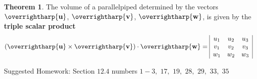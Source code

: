 \documentclass[letterpaper, twoside, 12pt]{book}
\newcommand{\<}{\langle}
\renewcommand{\>}{\rangle}
\theoremstyle{definition}
\newtheorem{theorem}{Theorem}
\theoremstyle{definition}
\newtheorem{eqn}[theorem]{Equation}
\newcommand{\harpvec}[1]{\overrightharp{\ensuremath{\mathbf{#1}}}}
\newcommand*{\threevec}[3]{\ensuremath{\left\langle #1, #2, #3 \right\rangle}}
\begin{document}
\begin{theorem}
  The volume of a parallelpiped determined by the vectors
  $\harpvec{u}$, $\harpvec{v}$, $\harpvec{w}$, is given by
  the \textbf{triple scalar product}
    \[
      (\harpvec{u}\times\harpvec{v})\cdot\harpvec{w} =
      \begin{array}{|c c c|}
      u_1 & u_2 & u_3 \\
      v_1 & v_2 & v_3 \\
      w_1 & w_2 & w_3 \\
      \end{array}
    \]
\end{theorem}

\noindent Suggested Homework:
Section $12.4$ numbers $1 - 3,$ $17,$ $19,$ $28,$ $29,$ $33,$ $35$





\end{document}
